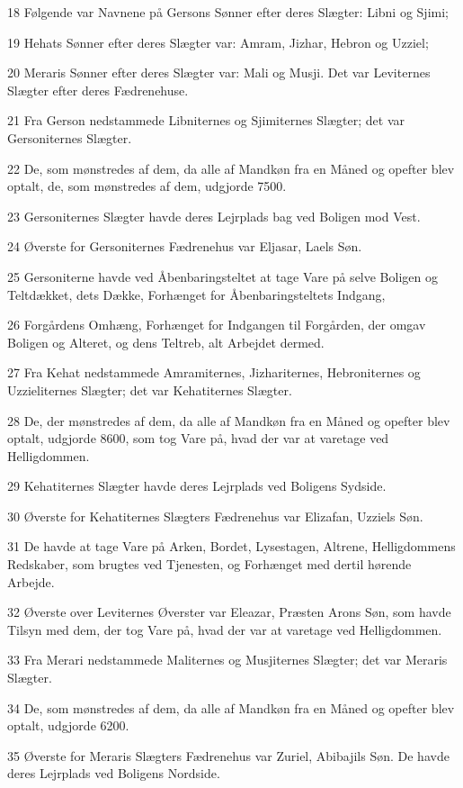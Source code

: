 \par 18 Følgende var Navnene på Gersons Sønner efter deres Slægter: Libni og Sjimi;
\par 19 Hehats Sønner efter deres Slægter var: Amram, Jizhar, Hebron og Uzziel;
\par 20 Meraris Sønner efter deres Slægter var: Mali og Musji. Det var Leviternes Slægter efter deres Fædrenehuse.
\par 21 Fra Gerson nedstammede Libniternes og Sjimiternes Slægter; det var Gersoniternes Slægter.
\par 22 De, som mønstredes af dem, da alle af Mandkøn fra en Måned og opefter blev optalt, de, som mønstredes af dem, udgjorde 7500.
\par 23 Gersoniternes Slægter havde deres Lejrplads bag ved Boligen mod Vest.
\par 24 Øverste for Gersoniternes Fædrenehus var Eljasar, Laels Søn.
\par 25 Gersoniterne havde ved Åbenbaringsteltet at tage Vare på selve Boligen og Teltdækket, dets Dække, Forhænget for Åbenbaringsteltets Indgang,
\par 26 Forgårdens Omhæng, Forhænget for Indgangen til Forgården, der omgav Boligen og Alteret, og dens Teltreb, alt Arbejdet dermed.
\par 27 Fra Kehat nedstammede Amramiternes, Jizhariternes, Hebroniternes og Uzzieliternes Slægter; det var Kehatiternes Slægter.
\par 28 De, der mønstredes af dem, da alle af Mandkøn fra en Måned og opefter blev optalt, udgjorde 8600, som tog Vare på, hvad der var at varetage ved Helligdommen.
\par 29 Kehatiternes Slægter havde deres Lejrplads ved Boligens Sydside.
\par 30 Øverste for Kehatiternes Slægters Fædrenehus var Elizafan, Uzziels Søn.
\par 31 De havde at tage Vare på Arken, Bordet, Lysestagen, Altrene, Helligdommens Redskaber, som brugtes ved Tjenesten, og Forhænget med dertil hørende Arbejde.
\par 32 Øverste over Leviternes Øverster var Eleazar, Præsten Arons Søn, som havde Tilsyn med dem, der tog Vare på, hvad der var at varetage ved Helligdommen.
\par 33 Fra Merari nedstammede Maliternes og Musjiternes Slægter; det var Meraris Slægter.
\par 34 De, som mønstredes af dem, da alle af Mandkøn fra en Måned og opefter blev optalt, udgjorde 6200.
\par 35 Øverste for Meraris Slægters Fædrenehus var Zuriel, Abibajils Søn. De havde deres Lejrplads ved Boligens Nordside.
